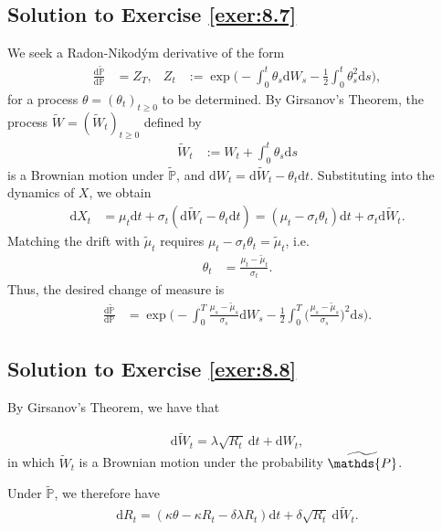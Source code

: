 \documentclass[12pt]{book}
\numberwithin{equation}{chapter}
\theoremstyle{plain}
\numberwithin{theorem}{section}
\theoremstyle{definition}
\numberwithin{exercise}{chapter}
\newcommand{\<}{\langle}
\renewcommand{\>}{\rangle}
\renewcommand{\(}{\left(}
\renewcommand{\)}{\right)}
\renewcommand{\[}{\left[}
\renewcommand{\]}{\right]}
\newcommand\Pb{\mathds{P}}
\newcommand\sig{\sigma}
\newcommand\Pbt{\widetilde{\Pb}}
\newcommand\Wt{\widetilde{W}}
\newcommand\dd{\mathrm{d}}
\begin{document}
\subsection*{Solution to Exercise \ref{exer:8.7}}
We seek a Radon-Nikod\'ym derivative of the form
\begin{align}
\frac{\dd \Pbt}{\dd \Pb}
	&=	Z_T , &
Z_t
	&:=	\exp \Big( - \int_0^t \theta_s \dd W_s - \tfrac{1}{2} \int_0^t \theta_s^2 \dd s \Big) ,
\end{align}
for a process $\theta = (\theta_t)_{t \geq 0}$ to be determined.  By Girsanov's Theorem, the process $\Wt = (\Wt_t)_{t \geq 0}$ defined by
\begin{align}
\Wt_t
	&:=	W_t + \int_0^t \theta_s \dd s
\end{align}
is a Brownian motion under $\Pbt$, and $\dd W_t = \dd \Wt_t - \theta_t \dd t$.  Substituting into the dynamics of $X$, we obtain
\begin{align}
\dd X_t
	&=	\mu_t \dd t + \sig_t ( \dd \Wt_t - \theta_t \dd t )
	=		( \mu_t - \sig_t \theta_t ) \dd t + \sig_t \dd \Wt_t .
\end{align}
Matching the drift with $\widetilde{\mu}_t$ requires $\mu_t - \sig_t \theta_t = \widetilde{\mu}_t$, i.e.
\begin{align}
\theta_t
	&=	\frac{\mu_t - \widetilde{\mu}_t}{\sig_t} .
\end{align}
Thus, the desired change of measure is
\begin{align}
\frac{\dd \Pbt}{\dd \Pb}
	&=	\exp \Big( - \int_0^T \frac{\mu_s - \widetilde{\mu}_s}{\sig_s} \dd W_s - \tfrac{1}{2} \int_0^T \Big( \frac{\mu_s - \widetilde{\mu}_s}{\sig_s} \Big)^2 \dd s \Big) .
\end{align}

\subsection*{Solution to Exercise \ref{exer:8.8}}

By Girsanov's Theorem, we have that

\begin{align}\mathrm{d} \widetilde{W}_{t}=\lambda \sqrt{R_{t}} \mathrm{~d} t+\mathrm{d} W_{t},
\end{align}
in which $\widetilde{W}_{t}$ is a Brownian motion under the probability $\widetilde \Pb$. 

Under $\Pbt$, we therefore have
\begin{align}\mathrm{d} R_{t}=\left(\kappa \theta-\kappa R_{t}-\delta \lambda R_{t}\right) \mathrm{d} t+\delta \sqrt{R_{t}} \mathrm{~d} \widetilde{W}_{t}.
\end{align}
\end{document}
